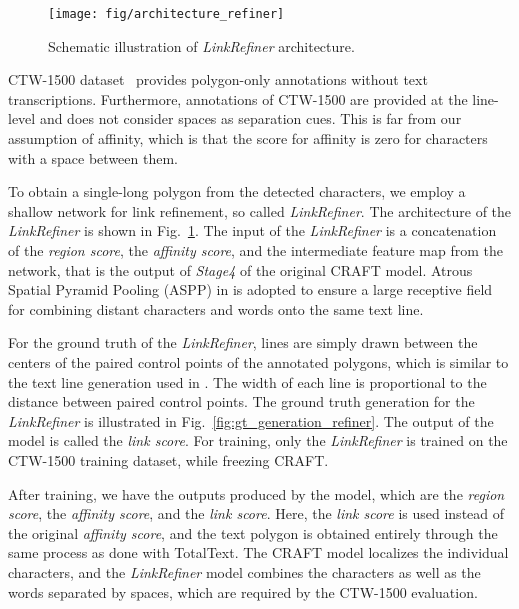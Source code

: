 \documentclass[10pt,twocolumn,letterpaper]{article}
\begin{document}
\begin{figure}[h]
	\begin{center}
        \texttt{[image: fig/architecture\_refiner]}
         \vspace{+1mm}
        \caption{Schematic illustration of \textit{LinkRefiner} architecture.}
  	    \label{fig:architecture_refiner} 
    \end{center}
     \vspace{-1.5mm}
\end{figure}


CTW-1500 dataset~\cite{yuliang2017detecting} provides polygon-only annotations without text transcriptions. Furthermore, annotations of CTW-1500 are provided at the line-level and does not consider spaces as separation cues. This is far from our assumption of affinity, which is that the score for affinity is zero for characters with a space between them.

To obtain a single-long polygon from the detected characters, we employ a shallow network for link refinement,  so called \textit{LinkRefiner}. The architecture of the \textit{LinkRefiner} is shown in Fig.~\ref{fig:architecture_refiner}. The input of the \textit{LinkRefiner} is a concatenation of the \textit{region score}, the \textit{affinity score}, and the intermediate feature map from the network, that is the output of \textit{Stage4} of the original CRAFT model. Atrous Spatial Pyramid Pooling (ASPP) in \cite{chen2018deeplab} is adopted to ensure a large receptive field for combining distant characters and words onto the same text line.

For the ground truth of the \textit{LinkRefiner}, lines are simply drawn between the centers of the paired control points of the annotated polygons, which is similar to the text line generation used in \cite{he2016accurate}. The width of each line is proportional to the distance between paired control points. The ground truth generation for the \textit{LinkRefiner} is illustrated in Fig.~\ref{fig:gt_generation_refiner}. The output of the model is called the \textit{link score}. For training, only the \textit{LinkRefiner} is trained on the CTW-1500 training dataset, while freezing CRAFT.


After training, we have the outputs produced by the model, which are the \textit{region score}, the \textit{affinity score}, and the \textit{link score}. Here, the  \textit{link score} is used instead of the original \textit{affinity score}, and the text polygon is obtained entirely through the same process as done with TotalText. The CRAFT model localizes the individual characters, and the \textit{LinkRefiner} model combines the characters as well as the words separated by spaces, which are required by the CTW-1500 evaluation.
\end{document}
